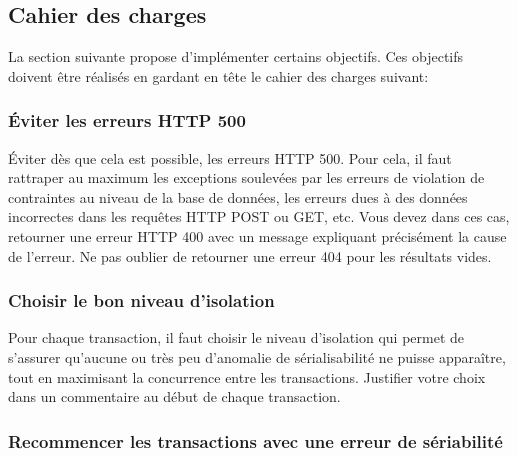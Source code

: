 \documentclass[10pt, vitellins]{article}
\newcounter{objectif}
\begin{document}
        


      \subsection*{Cahier des charges}

      La section suivante propose d'implémenter certains objectifs. Ces objectifs doivent être réalisés en gardant en tête le cahier des charges suivant:

      \subsubsection*{Éviter les erreurs HTTP 500}

      Éviter dès que cela est possible, les erreurs HTTP 500. Pour cela, il faut rattraper au maximum les exceptions soulevées par les erreurs de violation de contraintes au niveau de la base de données, les erreurs dues à des données incorrectes dans les requêtes HTTP POST ou GET, etc. Vous devez dans ces cas, retourner une erreur HTTP 400 avec un message expliquant précisément la cause de l'erreur. Ne pas oublier de retourner une erreur 404 pour les résultats vides.

      \subsubsection*{Choisir le bon niveau d'isolation}

      Pour chaque transaction, il faut choisir le niveau d'isolation qui permet de s'assurer qu'aucune ou très peu d'anomalie de sérialisabilité ne puisse apparaître, tout en maximisant la concurrence entre les transactions. Justifier votre choix dans un commentaire au début de chaque transaction. 
      
      \subsubsection*{Recommencer les transactions avec une erreur de sériabilité}
\end{document}
